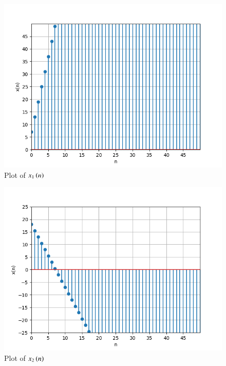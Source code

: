 \documentclass[journal,12pt,twocolumn]{IEEEtran}
\theoremstyle{remark}
\begin{document}
\begin{enumerate}
\begin{figure}[!ht]
\centering
\begin{center}
\includegraphics[width=\columnwidth]{Figure_1}
\caption{Plot of $x_1\left(n\right)$}
\end{center}
\end{figure}

\begin{figure}[!ht]
\centering
\begin{center}
\includegraphics[width=\columnwidth]{Figure_2}
\caption{Plot of $x_2\left(n\right)$}
\end{center}
\end{figure}

\end{enumerate}
\end{document}
